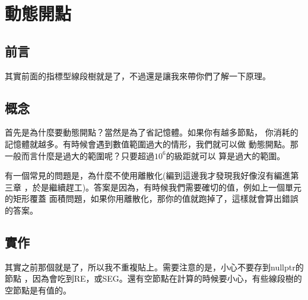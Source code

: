 \section{動態開點}
    \subsection{前言}
    其實前面的指標型線段樹就是了，不過還是讓我來帶你們了解一下原理。

    \subsection{概念}
    首先是為什麼要動態開點？當然是為了省記憶體。如果你有越多節點，
    你消耗的記憶體就越多。有時候會遇到數值範圍過大的情形，我們就可以做
    動態開點。那一般而言什麼是過大的範圍呢？只要超過$10^6$的級距就可以
    算是過大的範圍。

    有一個常見的問題是，為什麼不使用離散化(編到這邊我才發現我好像沒有編進第三章
    ，於是繼續趕工)。答案是因為，有時候我們需要確切的值，例如上一個單元的矩形覆蓋
    面積問題，如果你用離散化，那你的值就跑掉了，這樣就會算出錯誤的答案。

    \subsection{實作}
    其實之前那個就是了，所以我不重複貼上。需要注意的是，小心不要存到nullptr的節點
    ，因為會吃到RE，或SEG。還有空節點在計算的時候要小心，有些線段樹的空節點是有值的。